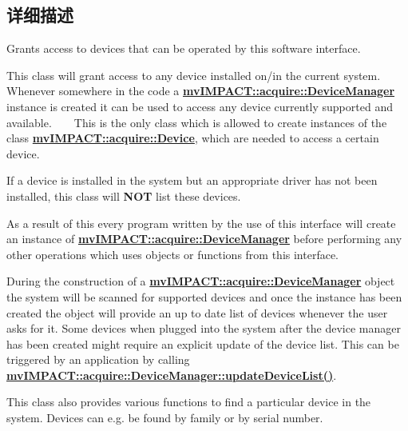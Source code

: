 \subsection{详细描述}
Grants access to devices that can be operated by this software interface. 

This class will grant access to any device installed on/in the current system. Whenever somewhere in the code a {\bfseries \hyperlink{classmv_i_m_p_a_c_t_1_1acquire_1_1_device_manager}{mv\+I\+M\+P\+A\+C\+T\+::acquire\+::\+Device\+Manager}} instance is created it can be used to access any device currently supported and available. ~\newline
 ~\newline
 This is the only class which is allowed to create instances of the class {\bfseries \hyperlink{classmv_i_m_p_a_c_t_1_1acquire_1_1_device}{mv\+I\+M\+P\+A\+C\+T\+::acquire\+::\+Device}}, which are needed to access a certain device.

If a device is installed in the system but an appropriate driver has not been installed, this class will {\bfseries N\+O\+T} list these devices.

As a result of this every program written by the use of this interface will create an instance of {\bfseries \hyperlink{classmv_i_m_p_a_c_t_1_1acquire_1_1_device_manager}{mv\+I\+M\+P\+A\+C\+T\+::acquire\+::\+Device\+Manager}} before performing any other operations which uses objects or functions from this interface.

During the construction of a {\bfseries \hyperlink{classmv_i_m_p_a_c_t_1_1acquire_1_1_device_manager}{mv\+I\+M\+P\+A\+C\+T\+::acquire\+::\+Device\+Manager}} object the system will be scanned for supported devices and once the instance has been created the object will provide an up to date list of devices whenever the user asks for it. Some devices when plugged into the system after the device manager has been created might require an explicit update of the device list. This can be triggered by an application by calling {\bfseries \hyperlink{classmv_i_m_p_a_c_t_1_1acquire_1_1_device_manager_a2078f9532f67854352c3be3e32364879}{mv\+I\+M\+P\+A\+C\+T\+::acquire\+::\+Device\+Manager\+::update\+Device\+List()}}.

This class also provides various functions to find a particular device in the system. Devices can e.\+g. be found by family or by serial number.


